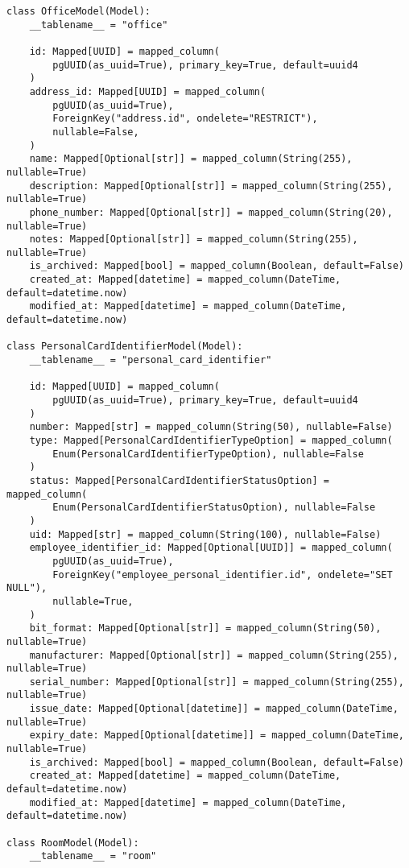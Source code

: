 \begin{lstlisting}[style=pythonstyle]
class OfficeModel(Model):
    __tablename__ = "office"

    id: Mapped[UUID] = mapped_column(
        pgUUID(as_uuid=True), primary_key=True, default=uuid4
    )
    address_id: Mapped[UUID] = mapped_column(
        pgUUID(as_uuid=True),
        ForeignKey("address.id", ondelete="RESTRICT"),
        nullable=False,
    )
    name: Mapped[Optional[str]] = mapped_column(String(255), nullable=True)
    description: Mapped[Optional[str]] = mapped_column(String(255), nullable=True)
    phone_number: Mapped[Optional[str]] = mapped_column(String(20), nullable=True)
    notes: Mapped[Optional[str]] = mapped_column(String(255), nullable=True)
    is_archived: Mapped[bool] = mapped_column(Boolean, default=False)
    created_at: Mapped[datetime] = mapped_column(DateTime, default=datetime.now)
    modified_at: Mapped[datetime] = mapped_column(DateTime, default=datetime.now)

class PersonalCardIdentifierModel(Model):
    __tablename__ = "personal_card_identifier"

    id: Mapped[UUID] = mapped_column(
        pgUUID(as_uuid=True), primary_key=True, default=uuid4
    )
    number: Mapped[str] = mapped_column(String(50), nullable=False)
    type: Mapped[PersonalCardIdentifierTypeOption] = mapped_column(
        Enum(PersonalCardIdentifierTypeOption), nullable=False
    )
    status: Mapped[PersonalCardIdentifierStatusOption] = mapped_column(
        Enum(PersonalCardIdentifierStatusOption), nullable=False
    )
    uid: Mapped[str] = mapped_column(String(100), nullable=False)
    employee_identifier_id: Mapped[Optional[UUID]] = mapped_column(
        pgUUID(as_uuid=True),
        ForeignKey("employee_personal_identifier.id", ondelete="SET NULL"),
        nullable=True,
    )
    bit_format: Mapped[Optional[str]] = mapped_column(String(50), nullable=True)
    manufacturer: Mapped[Optional[str]] = mapped_column(String(255), nullable=True)
    serial_number: Mapped[Optional[str]] = mapped_column(String(255), nullable=True)
    issue_date: Mapped[Optional[datetime]] = mapped_column(DateTime, nullable=True)
    expiry_date: Mapped[Optional[datetime]] = mapped_column(DateTime, nullable=True)
    is_archived: Mapped[bool] = mapped_column(Boolean, default=False)
    created_at: Mapped[datetime] = mapped_column(DateTime, default=datetime.now)
    modified_at: Mapped[datetime] = mapped_column(DateTime, default=datetime.now)

class RoomModel(Model):
    __tablename__ = "room"


\end{lstlisting}
